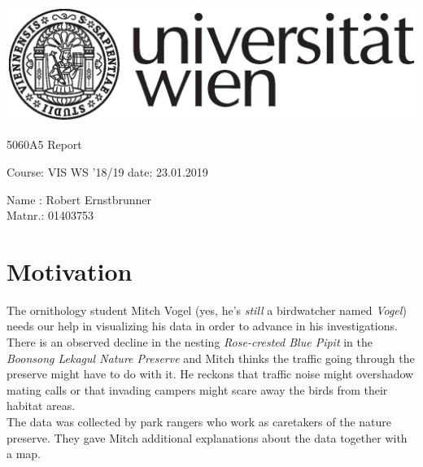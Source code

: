\documentclass{article}
\makeatletter
\newcommand\HUGE{\@setfontsize\Huge{50}{60}}
\makeatother
\begin{document}

 
\thispagestyle{empty}
\begin{center}
\begin{minipage}{.9\linewidth}
\flushright
	      		 
\includegraphics[width=0.5\linewidth]{univie.eps}\par
\vspace{1.5cm}
\centering 	
	{\scshape{\HUGE A5 Report \par}}
	\vspace{1cm}
    {\scshape{\Large Course: VIS WS '18/19 \quad  date: 23.01.2019\par}}
	\vspace{1cm}

 {\Large Name : Robert Ernstbrunner \\ Matnr.: 01403753 \hspace{2.2cm} \ \par}
 	\vspace{.7cm}

 

\end{minipage}
\end{center}
\clearpage

\section{Motivation}

The ornithology student Mitch Vogel (yes, he's \textit{still} a birdwatcher named \textit{Vogel}) needs our help in visualizing his data in order to advance in his investigations. There is an observed decline in the nesting \textit{Rose-crested Blue Pipit} in the \textit{Boonsong Lekagul Nature Preserve} and Mitch thinks the traffic going through the preserve might have to do with it.
He reckons that traffic noise might overshadow mating calls or that invading campers might scare away the birds from their habitat areas. \\
The data was collected by park rangers who work as caretakers of the nature preserve. They gave Mitch additional explanations about the data together with a map.\\
\end{document}
